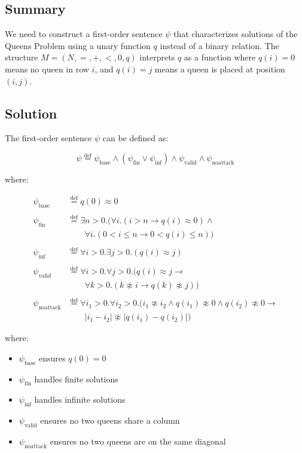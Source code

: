 \documentclass{article}
\newcommand{\defeq}{\stackrel{\text{def}}{=}}
\begin{document}
\subsection*{Summary}
We need to construct a first-order sentence $\psi$ that characterizes solutions of the Queens Problem using a unary function $q$ instead of a binary relation. The structure $M = (N, =, +, <, 0, q)$ interprets $q$ as a function where $q(i) = 0$ means no queen in row $i$, and $q(i) = j$ means a queen is placed at position $(i,j)$.

\subsection*{Solution}
The first-order sentence $\psi$ can be defined as:

\[ \psi \defeq \psi_{\text{base}} \wedge (\psi_{\text{fin}} \vee \psi_{\text{inf}}) \wedge \psi_{\text{valid}} \wedge \psi_{\text{noattack}} \]

where:

\begin{align*}
\psi_{\text{base}} &\defeq q(0) \approx 0 \\
\\
\psi_{\text{fin}} &\defeq \exists n > 0.(\forall i.(i > n \rightarrow q(i) \approx 0) \wedge \\
    &\qquad \forall i.(0 < i \leq n \rightarrow 0 < q(i) \leq n)) \\
\\
\psi_{\text{inf}} &\defeq \forall i > 0.\exists j > 0.(q(i) \approx j) \\
\\
\psi_{\text{valid}} &\defeq \forall i > 0.\forall j > 0.(q(i) \approx j \rightarrow \\
    &\qquad \forall k > 0.(k \not\approx i \rightarrow q(k) \not\approx j)) \\
\\
\psi_{\text{noattack}} &\defeq \forall i_1 > 0.\forall i_2 > 0.(i_1 \not\approx i_2 \wedge q(i_1) \not\approx 0 \wedge q(i_2) \not\approx 0 \rightarrow \\
    &\qquad |i_1 - i_2| \not\approx |q(i_1) - q(i_2)|)
\end{align*}

where:
\begin{itemize}
\item $\psi_{\text{base}}$ ensures $q(0) = 0$
\item $\psi_{\text{fin}}$ handles finite solutions
\item $\psi_{\text{inf}}$ handles infinite solutions
\item $\psi_{\text{valid}}$ ensures no two queens share a column
\item $\psi_{\text{noattack}}$ ensures no two queens are on the same diagonal
\end{itemize}
\end{document}
